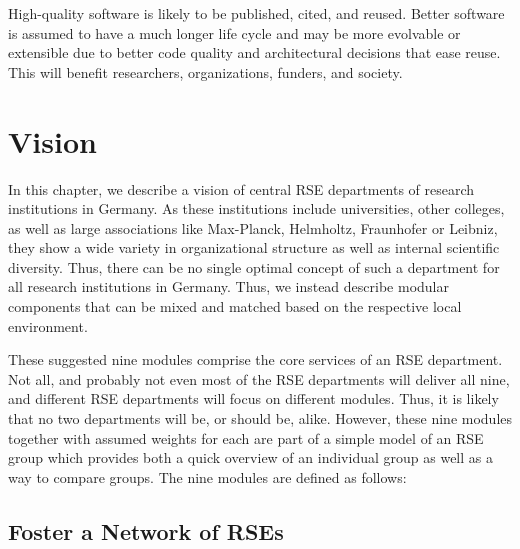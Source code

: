 \documentclass[a4paper]{article}
\begin{document}
High-quality software is likely to be published, cited, and reused.
Better software is assumed to have a much longer life cycle and may be more evolvable or extensible due to better code quality and architectural decisions that ease reuse.
This will benefit researchers, organizations, funders, and society.







\section{Vision}
\label{sec:vision}
In this chapter, we describe a vision of central RSE departments of research institutions in Germany.
As these institutions include universities, other colleges, as well as large associations like Max-Planck, Helmholtz, Fraunhofer or Leibniz,
they show a wide variety in organizational structure as well as internal scientific diversity.
Thus, there can be no single optimal concept of such a department for all research institutions in Germany.
Thus, we instead describe modular components that can be mixed and matched based on the respective local environment.

These suggested nine modules comprise the core services of an RSE department.
Not all, and probably not even most of the RSE departments will deliver all nine, and different RSE departments will focus on different modules.
Thus, it is likely that no two departments will be, or should be, alike.
However, these nine modules together with assumed weights for each are part of a simple model of an RSE group which provides both a quick overview of an individual group as well as a way to compare groups.
The nine modules are defined as follows:

\subsection{Foster a Network of RSEs}
\label{sec:network}
\end{document}

